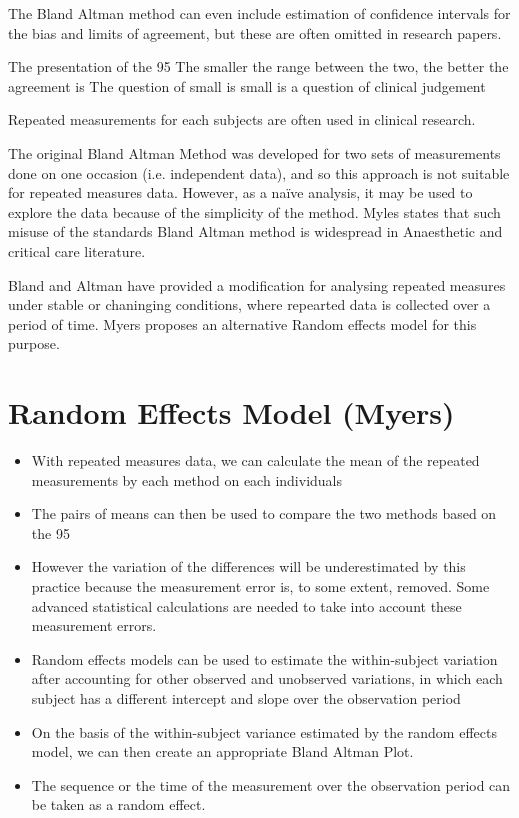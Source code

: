 The Bland Altman method can even include estimation of confidence intervals for the bias and limits of agreement, 
but these are often omitted in research papers.

The presentation of the 95%
The smaller the range between the two, the better the agreement is 
The question of small is small is a question of clinical judgement

Repeated measurements for each subjects are often used in clinical research.


The original Bland Altman Method was developed for two sets of measurements done on one occasion (i.e. independent data), and so this approach is not suitable for repeated measures data. However, as a naïve analysis, it may be used to explore the data because of the simplicity of the method. Myles states that such misuse of the standards Bland Altman method is widespread in Anaesthetic and critical care literature.

Bland and Altman have provided a modification for analysing repeated measures under stable or chaninging conditions, where repearted data is collected over a period of time. 
Myers proposes an alternative Random effects model for this purpose.

\section{Random Effects Model  (Myers)}
\begin{itemize}
\item	With repeated measures data, we can calculate the mean of the repeated measurements by each method on each individuals
\item	The pairs of means can then be used to compare the two methods based on the 95%
\item	However the variation of the differences will be underestimated by this practice because the measurement error is, to some extent, removed. Some advanced statistical calculations are needed to take into account these measurement errors.
\item	Random effects models can be used to estimate the within-subject variation after accounting for other observed and unobserved variations, in which each subject has a different intercept and slope over the observation period
\item	On the basis of the within-subject variance estimated by the random effects model, we can then create an appropriate Bland Altman Plot.
\item	The sequence or the time of the measurement over the observation period can be taken as a random effect.
\end{itemize}

